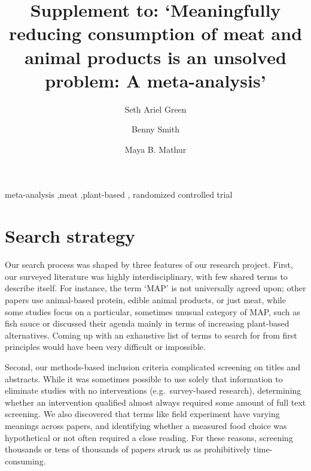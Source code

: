\documentclass[preprint, 3p,
authoryear]{elsarticle} %
\begin{document}
\begin{frontmatter}

  \title{Supplement to: `Meaningfully reducing consumption of meat and
animal products is an unsolved problem: A meta-analysis'}
    \author[1]{Seth Ariel Green%
  }
    \author[2]{Benny Smith%
  }
  
    \author[1]{Maya B. Mathur%
  }
  
  \begin{abstract}
  
  \end{abstract}
    \begin{keyword}
    meta-analysis \sep meat \sep plant-based \sep 
    randomized controlled trial
  \end{keyword}
  
 \end{frontmatter}

\section{Search strategy}\label{search-strategy}

Our search process was shaped by three features of our research project.
First, our surveyed literature was highly interdisciplinary, with few
shared terms to describe itself. For instance, the term `MAP' is not
universally agreed upon; other papers use animal-based protein, edible
animal products, or just meat, while some studies focus on a particular,
sometimes unusual category of MAP, such as fish sauce
\citep{kanchanachitra2020} or discussed their agenda mainly in terms of
increasing plant-based alternatives. Coming up with an exhaustive list
of terms to search for from first principles would have been very
difficult or impossible.

Second, our methods-based inclusion criteria complicated screening on
titles and abstracts. While it was sometimes possible to use solely that
information to eliminate studies with no interventions
(e.g.~survey-based research), determining whether an intervention
qualified almost always required some amount of full text screening. We
also discovered that terms like field experiment have varying meanings
across papers, and identifying whether a measured food choice was
hypothetical or not often required a close reading. For these reasons,
screening thousands or tens of thousands of papers struck us as
prohibitively time-consuming.
\end{document}
